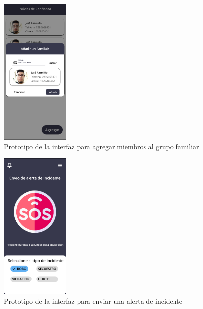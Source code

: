 \begin{figure}[H]
      \centering
      \includegraphics[width=0.3\textwidth]{chapters/III-resultados-y-discusion/resources/images/prototipo-agregar-miembro-mobile.png}
      \caption{Prototipo de la interfaz para agregar miembros al grupo familiar}
      \label{fig:prototipo-agregar-miembro-mobile}
\end{figure}

\begin{figure}[H]
      \centering
      \includegraphics[width=0.3\textwidth]{chapters/III-resultados-y-discusion/resources/images/prototipo-inicio-mobile.png}
      \caption{Prototipo de la interfaz para enviar una alerta de incidente}
      \label{fig:prototipo-inicio-mobile}
\end{figure}

